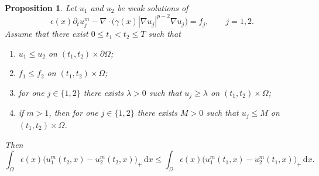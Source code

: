\documentclass[a4paper,12pt]{article}
\newcommand{\pr}{\partial}
\newcommand{\dd}{\,\mathrm{d}}
\newtheorem{prop}[thm]{Proposition}
\theoremstyle{definition}
\theoremstyle{remark}
\begin{document}
\begin{prop}\label{prop:comparison}
Let $u_1$ and $u_2$ be weak solutions of
\[
\epsilon(x)\pr_t u_j^m-\nabla\cdot\bigl(\gamma(x)|\nabla u_j|^{p-2}\nabla u_j\bigr)=f_j,
\qquad j=1,2.
\]
Assume that there exist $0\le t_1<t_2\le T$ such that
\begin{enumerate}
\item $u_1\le u_2$ on $(t_1,t_2)\times\pr\Omega$;
\item $f_1\le f_2$ on $(t_1,t_2)\times\Omega$;
\item for one $j\in\{1,2\}$ there exists $\lambda>0$ such that $u_j\ge \lambda$ on $(t_1,t_2)\times\Omega$;
\item if $m>1$, then for one $j\in\{1,2\}$ there exists $M>0$ such that $u_j\le M$ on $(t_1,t_2)\times\Omega$.
\end{enumerate}
Then
\begin{equation}\label{eq:comparison-ineq}
\int_\Omega \epsilon(x)\bigl(u_1^m(t_2,x)-u_2^m(t_2,x)\bigr)_+\dd x
\le
\int_\Omega \epsilon(x)\bigl(u_1^m(t_1,x)-u_2^m(t_1,x)\bigr)_+\dd x.
\end{equation}
\end{prop}
\end{document}
